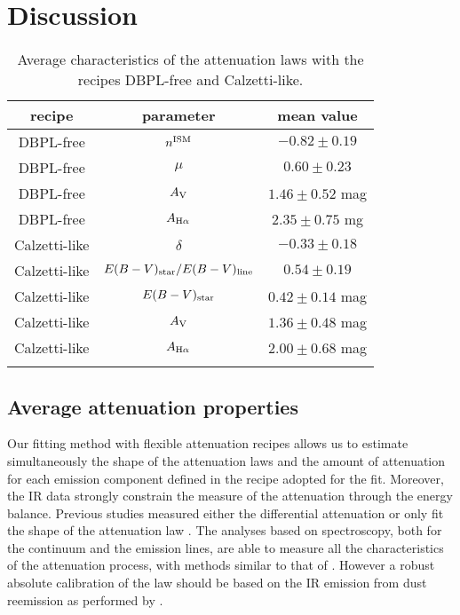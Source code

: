 \documentclass{aa}
\begin{document}
\section{Discussion}

\begin{table}
\scriptsize
\centering
\caption{Average characteristics of the attenuation laws with the recipes DBPL-free and Calzetti-like.}
\begin{tabular}{c c c}
\hline
recipe & parameter & mean value \\
\hline
DBPL-free & $n^{\rm ISM}$ & $-0.82\pm 0.19$ \\
DBPL-free & $\mu$ & $0.60\pm 0.23$\\
DBPL-free& $A_{\rm V}$ &  $1.46\pm 0.52$ mag\\
DBPL-free& $A_{\rm H\alpha}$&$2.35\pm 0.75$ mg\\
\hline
Calzetti-like & $\delta$&$-0.33 \pm 0.18$\\
Calzetti-like & $E(B-V)_{\rm star}/E(B-V)_{\rm line}$& $0.54\pm 0.19$\\
Calzetti-like & $E(B-V)_{\rm star}$ & $0.42\pm 0.14$ mag\\
Calzetti-like & $A_{\rm V}$ &  $1.36\pm 0.48$ mag\\
Calzetti-like & $A_{\rm H\alpha}$&$2.00\pm 0.68$ mag\\
\hline
\label{averagelaws}
\end{tabular}
\end{table}
\subsection{Average attenuation properties}
Our fitting method with flexible attenuation recipes allows us to estimate simultaneously  the shape of the attenuation laws and the amount of attenuation for each emission component defined in the recipe adopted for the fit. Moreover, the IR data strongly constrain the measure of the attenuation  through the energy balance. Previous studies measured either the differential attenuation \citep{Kashino13,Price14,Puglisi16}  or only fit  the shape of the attenuation law \citep{Salmon16,Salim18}. The analyses based on spectroscopy, both  for the continuum and the emission lines,  are able to measure all the characteristics of the attenuation process, with methods similar to that of  \citet{Calzetti94} \citep{ Reddy15,Battisti16}. However a robust  absolute calibration of the law should  be based  on the IR emission from dust reemission as performed  by \citet{Calzetti00}. 
\end{document}
